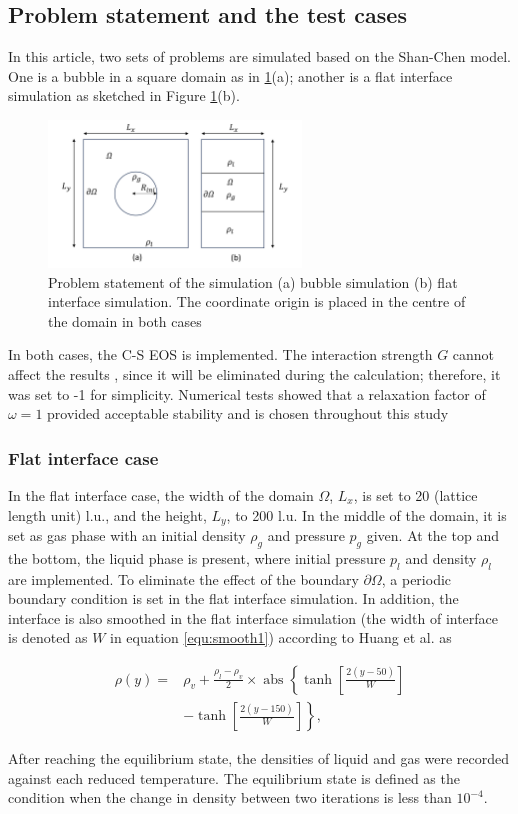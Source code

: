 \documentclass[review]{elsarticle}
\begin{document}
\subsection{Problem statement and the test cases}
In this article, two sets of problems are simulated based on the Shan-Chen model. One is a bubble in a square domain as in \ref{fig:schematic}(a); another is a flat interface simulation as sketched in Figure \ref{fig:schematic}(b). 
\begin{figure}[htp]
	\centering
	\includegraphics[width=0.6\textwidth]{schematic.png}
	\caption{Problem statement of the simulation (a) bubble simulation (b) flat interface simulation. The coordinate origin is placed in the centre of the domain in both cases}
	\label{fig:schematic}
\end{figure}
In both cases, the C-S EOS is implemented. The interaction strength $G$ cannot affect the results \cite{shi2020numerical}, since it will be eliminated during the calculation; therefore, it was set to -1 for simplicity. Numerical tests showed that a relaxation factor of $\omega=1$ provided acceptable stability and is chosen throughout this study
\subsubsection{Flat interface case}
In the flat interface case, the width of the domain $\Omega$, $L_x$, is set to 20 (lattice length unit) l.u., and the height, $L_y$, to 200 l.u. In the middle of the domain, it is set as gas phase with an initial density $\rho_g$ and pressure $p_g$ given. At the top and the bottom, the liquid phase is present, where initial pressure $p_l$ and density $\rho_l$ are implemented. To eliminate the effect of the boundary $\partial \Omega$, a periodic boundary condition is set in the flat interface simulation. In addition, the interface is also smoothed in the flat interface simulation (the width of interface is denoted as $W$ in equation \ref{equ:smooth1}) according to Huang et al. \cite{huang2019thermodynamic} as
\begin{linenomath*}
\begin{equation}
	\begin{aligned}
		\rho(y)= & \rho_v+\frac{\rho_l-\rho_v}{2} \times \operatorname{abs}\left\{\tanh \left[\frac{2(y-50)}{W}\right]\right. \\
		& \left.-\tanh \left[\frac{2(y-150)}{W}\right]\right\},
	\end{aligned}
\label{equ:smooth1}
\end{equation}
\end{linenomath*}
After reaching the equilibrium state, the densities of liquid and gas were recorded against each reduced temperature. The equilibrium state is defined as the condition when the change in density between two iterations is less than $10^{-4}$.
\end{document}
